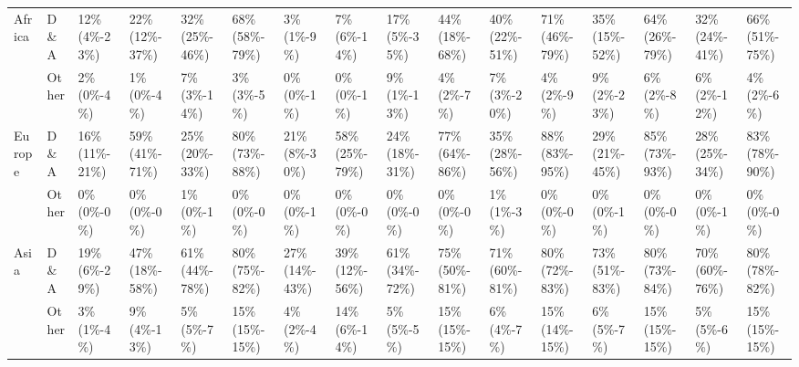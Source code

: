 \begin{tabular}{ll p{1cm} p{1cm} p{1cm} p{1cm} p{1cm} p{1cm} p{1cm} p{1cm} p{1cm} p{1cm} p{1cm} p{1cm} p{1cm} p{1cm}}
Africa & D\&A &               12\% \mbox{(4\%-23\%)} &  22\% \mbox{(12\%-37\%)} &          32\% \mbox{(25\%-46\%)} &  68\% \mbox{(58\%-79\%)} &           3\% \mbox{(1\%-9\%)} &    7\% \mbox{(6\%-14\%)} &                  17\% \mbox{(5\%-35\%)} &  44\% \mbox{(18\%-68\%)} &       40\% \mbox{(22\%-51\%)} &  71\% \mbox{(46\%-79\%)} &  35\% \mbox{(15\%-52\%)} &  64\% \mbox{(26\%-79\%)} &  32\% \mbox{(24\%-41\%)} &  66\% \mbox{(51\%-75\%)} \\
       & Other &                 2\% \mbox{(0\%-4\%)} &     1\% \mbox{(0\%-4\%)} &            7\% \mbox{(3\%-14\%)} &     3\% \mbox{(3\%-5\%)} &           0\% \mbox{(0\%-1\%)} &     0\% \mbox{(0\%-1\%)} &                   9\% \mbox{(1\%-13\%)} &     4\% \mbox{(2\%-7\%)} &         7\% \mbox{(3\%-20\%)} &     4\% \mbox{(2\%-9\%)} &    9\% \mbox{(2\%-23\%)} &     6\% \mbox{(2\%-8\%)} &    6\% \mbox{(2\%-12\%)} &     4\% \mbox{(2\%-6\%)} \\
Europe & D\&A &              16\% \mbox{(11\%-21\%)} &  59\% \mbox{(41\%-71\%)} &          25\% \mbox{(20\%-33\%)} &  80\% \mbox{(73\%-88\%)} &         21\% \mbox{(8\%-30\%)} &  58\% \mbox{(25\%-79\%)} &                 24\% \mbox{(18\%-31\%)} &  77\% \mbox{(64\%-86\%)} &       35\% \mbox{(28\%-56\%)} &  88\% \mbox{(83\%-95\%)} &  29\% \mbox{(21\%-45\%)} &  85\% \mbox{(73\%-93\%)} &  28\% \mbox{(25\%-34\%)} &  83\% \mbox{(78\%-90\%)} \\
       & Other &                 0\% \mbox{(0\%-0\%)} &     0\% \mbox{(0\%-0\%)} &             1\% \mbox{(0\%-1\%)} &     0\% \mbox{(0\%-0\%)} &           0\% \mbox{(0\%-1\%)} &     0\% \mbox{(0\%-0\%)} &                    0\% \mbox{(0\%-0\%)} &     0\% \mbox{(0\%-0\%)} &          1\% \mbox{(1\%-3\%)} &     0\% \mbox{(0\%-0\%)} &     0\% \mbox{(0\%-1\%)} &     0\% \mbox{(0\%-0\%)} &     0\% \mbox{(0\%-1\%)} &     0\% \mbox{(0\%-0\%)} \\
Asia & D\&A &               19\% \mbox{(6\%-29\%)} &  47\% \mbox{(18\%-58\%)} &          61\% \mbox{(44\%-78\%)} &  80\% \mbox{(75\%-82\%)} &        27\% \mbox{(14\%-43\%)} &  39\% \mbox{(12\%-56\%)} &                 61\% \mbox{(34\%-72\%)} &  75\% \mbox{(50\%-81\%)} &       71\% \mbox{(60\%-81\%)} &  80\% \mbox{(72\%-83\%)} &  73\% \mbox{(51\%-83\%)} &  80\% \mbox{(73\%-84\%)} &  70\% \mbox{(60\%-76\%)} &  80\% \mbox{(78\%-82\%)} \\
       & Other &                 3\% \mbox{(1\%-4\%)} &    9\% \mbox{(4\%-13\%)} &             5\% \mbox{(5\%-7\%)} &  15\% \mbox{(15\%-15\%)} &           4\% \mbox{(2\%-4\%)} &   14\% \mbox{(6\%-14\%)} &                    5\% \mbox{(5\%-5\%)} &  15\% \mbox{(15\%-15\%)} &          6\% \mbox{(4\%-7\%)} &  15\% \mbox{(14\%-15\%)} &     6\% \mbox{(5\%-7\%)} &  15\% \mbox{(15\%-15\%)} &     5\% \mbox{(5\%-6\%)} &  15\% \mbox{(15\%-15\%)} \\

\end{tabular}
